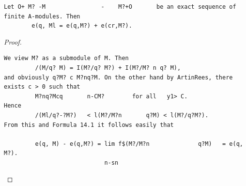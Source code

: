 \begin{theorem}\label{mcrt-auto-theorem-14-6}\uses{}
\begin{verbatim}
Let O+ M? -M                -    M?+O       be an exact sequence of
finite A-modules. Then
        e(q, Ml = e(q,M?) + e(cr,M?).
\end{verbatim}
\end{theorem}
\begin{proof}
\begin{verbatim}
We view M? as a submodule of M. Then
         /(M/q? M) = I(M?/q? M?) + I(M?/M? n q? M),
and obviously q?M? c M?nq?M. On the other hand by ArtinRees, there
exists c > 0 such that
         M?nq?Mcq       n-CM?        for all   y1> C.
Hence
         /(Ml/q?-?M?)   < l(M?/M?n       q?M) < l(M?/q?M?).
From this and Formula 14.1 it follows easily that

         e(q, M) - e(q,M?) = lim f$(M?/M?n              q?M)   = e(q, M?).
                             n-sn
\end{verbatim}
\end{proof}


